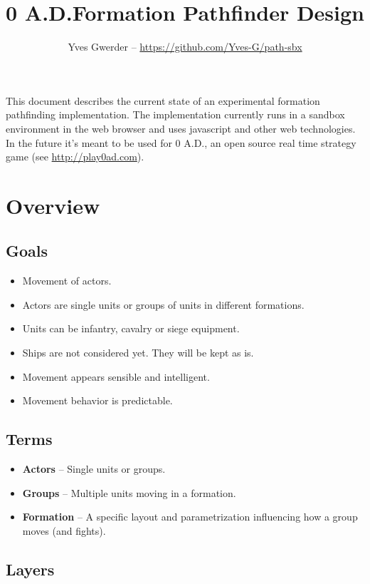 \documentclass[a4paper,10pt]{article}
\title{0 A.D.\@ Formation Pathfinder Design}
\author{Yves Gwerder -- \url{https://github.com/Yves-G/path-sbx}}
\begin{document}
\maketitle

This document describes the current state of an experimental formation pathfinding implementation. The implementation currently runs in a sandbox environment in the web browser and uses javascript and other web technologies. In the future it's meant to be used for 0 A.D., an open source real time strategy game (see \url{http://play0ad.com}).

\tableofcontents

\section{Overview}

\subsection{Goals}

\begin{itemize}
 \item Movement of actors.
 \item Actors are single units or groups of units in different formations.
 \item Units can be infantry, cavalry or siege equipment.
 \item Ships are not considered yet. They will be kept as is.
 \item Movement appears sensible and intelligent.
 \item Movement behavior is predictable.
\end{itemize}

\subsection{Terms}

\begin{itemize}
 \item \textbf{Actors} --
  Single units or groups.
 \item \textbf{Groups} --
  Multiple units moving in a formation.
 \item \textbf{Formation} --
  A specific layout and parametrization influencing how a group moves (and fights).
\end{itemize}

\subsection{Layers}
\end{document}
